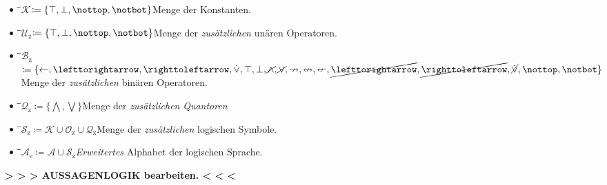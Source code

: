 \documentclass[english,ngerman,parskip=half,headsepline,footsepline]{scrreprt}
\newcommand{\WWtrue}{W}
\newcommand{\ltrue}{\top}      %
\newcommand{\lnfalse}{\notbot} %
\newcommand{\lfalse}{\bot}     %
\newcommand{\lntrue}{\nottop}  %
\newcommand{\lnxor}{\operatorname{\cancel{\lxor}}}     %
\newcommand{\lleftimp}{\operatorname{\leftarrow}}      %
\newcommand{\lleft}{\operatorname{\righttoleftarrow}}  %
\newcommand{\lright}{\operatorname{\lefttorightarrow}} %
\newcommand{\lnand}{\operatorname{\cancel{\land}}}     %
\newcommand{\lnequiv}{\operatorname{\nleftrightarrow}} %
\newcommand{\lxor}{\operatorname{\dot{\lor}}}          %
\newcommand{\lnright}{\operatorname{\cancel{\lright}}} %
\newcommand{\lnimp}{\operatorname{\nrightarrow}}       %
\newcommand{\lnleft}{\operatorname{\cancel{\lleft}}}   %
\newcommand{\lnleftimp}{\operatorname{\nleftarrow}}    %
\newcommand{\lnor}{\operatorname{\cancel{\lor}}}       %
\newcommand{\defeq}{\coloneqq}
\begin{document}
	\begin{itemize}
		\newcommand{\Item}[3]{\item\begin{tabbing}\hspace{0.7cm}\=\hspace{5cm}\=\kill #1\>#2\>#3\end{tabbing}}

		\Item{$\mathcal{K}$}{$\defeq\{\ltrue,\lfalse,\lntrue,\lnfalse\}$}
		{Menge der Konstanten.}

		\Item{$\mathcal{U}_\mathrm{z}$}{$\defeq\{\ltrue,\lfalse,\lntrue,\lnfalse\}$}
		{Menge der \emph{zusätzlichen} unären Operatoren.}

		\Item{$\mathcal{B}_\mathrm{z}$}{$\defeq\{\lleftimp,\lright,\lleft,\lxor,\ltrue,\lfalse,\lnand,\lnor,\lnimp,\lnequiv,\lnleftimp,\lnright,\lnleft,\lnxor,\lntrue,\lnfalse\}$}
		{\\\>\>Menge der \emph{zusätzlichen} binären Operatoren.}

		\Item{$\mathcal{Q}_\mathrm{z}$}{$\defeq\{\bigwedge,\bigvee\}$}
		{Menge der \emph{zusätzlichen} \emph{Quantoren}}

		\Item{$\mathcal{S}_\mathrm{z}$}{$\defeq\mathcal{K}\cup\mathcal{O}_\mathrm{z}\cup\mathcal{Q}_\mathrm{z}$}
		{Menge der \emph{zusätzlichen} logischen Symbole.}

		\Item{$\mathcal{A}_\mathrm{e}$}{$\defeq\mathcal{A}\cup\mathcal{S}_\mathrm{z}$}
		{\emph{Erweitertes} Alphabet der logischen Sprache.}

	\end{itemize}


	\par \textbf{> > > AUSSAGENLOGIK bearbeiten. < < <} %
\end{document}
